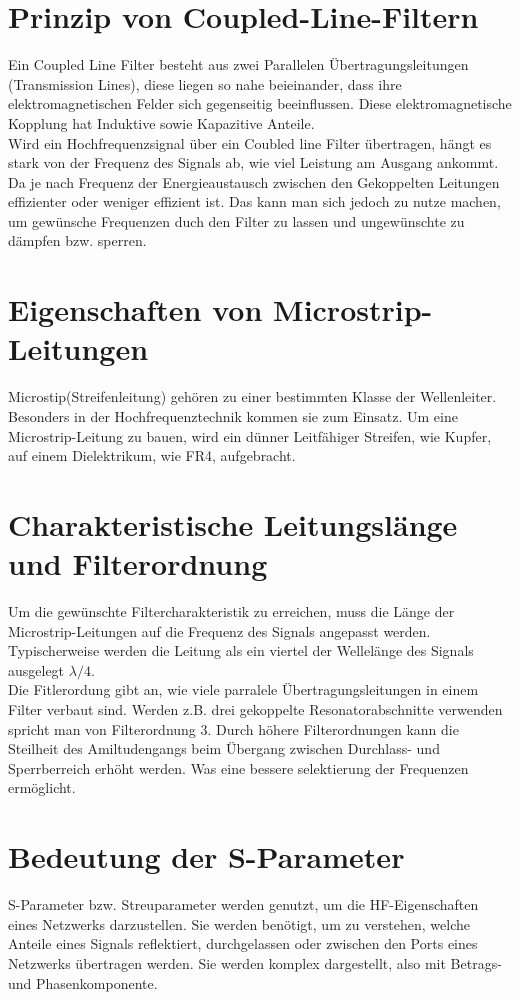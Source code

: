 \section{Prinzip von Coupled-Line-Filtern}
Ein Coupled Line Filter besteht aus zwei Parallelen Übertragungsleitungen (Transmission Lines), 
diese liegen so nahe beieinander, dass ihre elektromagnetischen Felder sich gegenseitig beeinflussen.
Diese elektromagnetische Kopplung hat Induktive sowie Kapazitive Anteile.
\\
Wird ein Hochfrequenzsignal über ein Coubled line Filter übertragen, hängt es stark
von der Frequenz des Signals ab, wie viel Leistung am Ausgang ankommt.
Da je nach Frequenz der Energieaustausch zwischen den Gekoppelten Leitungen effizienter oder weniger effizient ist.
Das kann man sich jedoch zu nutze machen, um gewünsche Frequenzen duch den Filter zu lassen und ungewünschte zu dämpfen bzw. sperren.

\section{Eigenschaften von Microstrip-Leitungen}
Microstip(Streifenleitung) gehören zu einer bestimmten Klasse der Wellenleiter.
Besonders in der Hochfrequenztechnik kommen sie zum Einsatz.
Um eine Microstrip-Leitung zu bauen, wird ein dünner Leitfähiger Streifen, wie Kupfer, auf einem Dielektrikum, wie FR4, aufgebracht.
\newpage
\section{Charakteristische Leitungslänge und Filterordnung}
Um die gewünschte Filtercharakteristik zu erreichen,
muss die Länge der Microstrip-Leitungen auf die Frequenz des Signals angepasst werden.
Typischerweise werden die Leitung als ein viertel der Wellelänge des Signals ausgelegt
$\lambda/4$. 
\\
Die Fitlerordung gibt an, wie viele parralele Übertragungsleitungen in einem Filter verbaut sind.
Werden z.B. drei gekoppelte Resonatorabschnitte verwenden spricht man von Filterordnung 3.
Durch höhere Filterordnungen kann die Steilheit des Amiltudengangs beim Übergang zwischen Durchlass- und Sperrberreich erhöht werden.
Was eine bessere selektierung der Frequenzen ermöglicht.


\section{Bedeutung der S-Parameter}
S-Parameter bzw. Streuparameter werden genutzt, um die HF-Eigenschaften eines
Netzwerks darzustellen. Sie werden benötigt, um zu verstehen, welche Anteile eines Signals
reflektiert, durchgelassen oder zwischen den Ports eines Netzwerks übertragen werden.
Sie werden komplex dargestellt, also mit Betrags- und Phasenkomponente.

